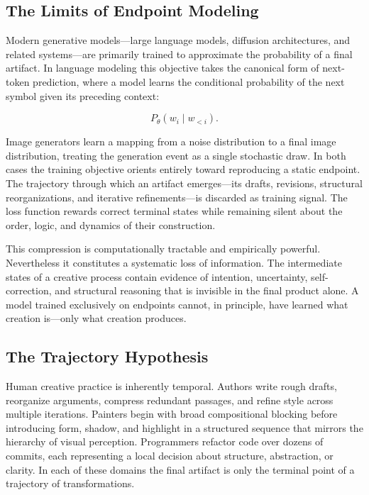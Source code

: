 \documentclass[12pt,a4paper]{article}
\theoremstyle{draftthm}
\begin{document}
\subsection{The Limits of Endpoint Modeling}

Modern generative models---large language models, diffusion architectures, and related systems---are primarily trained to approximate the probability of a final artifact. In language modeling this objective takes the canonical form of next-token prediction, where a model learns the conditional probability of the next symbol given its preceding context:

\begin{equation}
  P_{\theta}(w_i \mid w_{<i}).
\end{equation}

Image generators learn a mapping from a noise distribution to a final image distribution, treating the generation event as a single stochastic draw. In both cases the training objective orients entirely toward reproducing a static endpoint. The trajectory through which an artifact emerges---its drafts, revisions, structural reorganizations, and iterative refinements---is discarded as training signal. The loss function rewards correct terminal states while remaining silent about the order, logic, and dynamics of their construction.

This compression is computationally tractable and empirically powerful. Nevertheless it constitutes a systematic loss of information. The intermediate states of a creative process contain evidence of intention, uncertainty, self-correction, and structural reasoning that is invisible in the final product alone. A model trained exclusively on endpoints cannot, in principle, have learned what creation is---only what creation produces.

\subsection{The Trajectory Hypothesis}

Human creative practice is inherently temporal. Authors write rough drafts, reorganize arguments, compress redundant passages, and refine style across multiple iterations. Painters begin with broad compositional blocking before introducing form, shadow, and highlight in a structured sequence that mirrors the hierarchy of visual perception. Programmers refactor code over dozens of commits, each representing a local decision about structure, abstraction, or clarity. In each of these domains the final artifact is only the terminal point of a trajectory of transformations.
\end{document}
